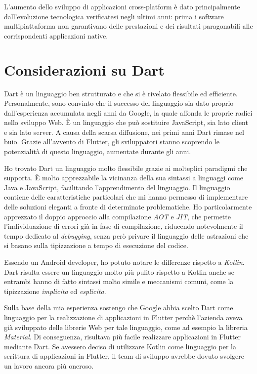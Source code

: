 L'aumento dello sviluppo di applicazioni cross-platform è dato principalmente dall'evoluzione tecnologica verificatesi negli ultimi anni: prima i software multipiattaforma non garantivano delle prestazioni e dei risultati paragonabili alle corrispondenti applicazioni native.

\section{Considerazioni su Dart}
Dart è un linguaggio ben strutturato e che si è rivelato flessibile ed efficiente. Personalmente, sono convinto che il successo del linguaggio sia dato proprio dall'esperienza accumulata negli anni da Google, la quale affonda le proprie radici nello sviluppo Web. È un linguaggio che può sostituire JavaScript, sia lato client e sia lato server. A causa della scarsa diffusione, nei primi anni Dart rimase nel buio. Grazie all'avvento di Flutter, gli sviluppatori stanno scoprendo le potenzialità di questo linguaggio, aumentate durante gli anni.

Ho trovato Dart un linguaggio molto flessibile grazie ai molteplici paradigmi che supporta. È molto apprezzabile la vicinanza della sua sintassi a linguaggi come Java e JavaScript, facilitando l'apprendimento del linguaggio. Il linguaggio contiene delle caratteristiche particolari che mi hanno permesso di implementare delle soluzioni eleganti a fronte di determinate problematiche.
Ho particolarmente apprezzato il doppio approccio alla compilazione \textit{AOT} e \textit{JIT}, che permette l’individuazione di errori già in fase di compilazione, riducendo notevolmente il tempo dedicato al \textit{debugging}, senza però privare il linguaggio delle astrazioni che si basano sulla tipizzazione a tempo di esecuzione del codice.

Essendo un Android developer, ho potuto notare le differenze rispetto a \textit{Kotlin}. Dart risulta essere un linguaggio molto più pulito rispetto a Kotlin anche se entrambi hanno di fatto sintassi molto simile e meccanismi comuni, come la tipizzazione \textit{implicita} ed \textit{esplicita}.

Sulla base della mia esperienza sostengo che Google abbia scelto Dart come linguaggio per la realizzazione di applicazioni in Flutter perchè l'azienda aveva già sviluppato delle librerie Web per tale linguaggio, come ad esempio la libreria \textit{Material}. Di conseguenza, risultava più facile realizzare applicazioni in Flutter mediante Dart. Se avessero deciso di utilizzare Kotlin come linguaggio per la scrittura di applicazioni in Flutter, il team di sviluppo avrebbe dovuto svolgere un lavoro ancora più oneroso.

